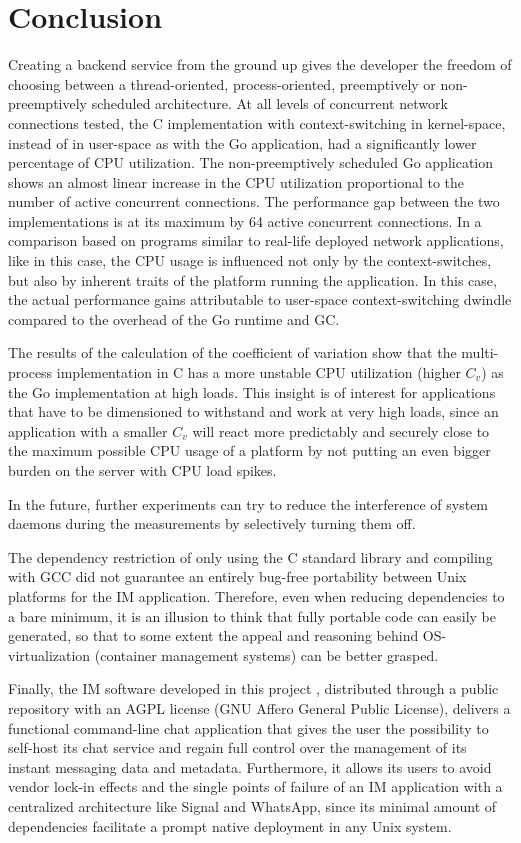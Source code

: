 \section{Conclusion}
Creating a backend service from the ground up gives the developer the freedom of choosing between a thread-oriented, process-oriented, preemptively or non-preemptively scheduled architecture. At all levels of concurrent network connections tested, the C implementation with context-switching in kernel-space, instead of in user-space as with the Go application, had a significantly lower percentage of CPU utilization. The non-preemptively scheduled Go application shows an almost linear increase in the CPU utilization proportional to the number of active concurrent connections. The performance gap between the two implementations is at its maximum by 64 active concurrent connections. In a comparison based on programs similar to real-life deployed network applications, like in this case, the CPU usage is influenced not only by the context-switches, but also by inherent traits of the platform running the application. In this case, the actual performance gains attributable to user-space context-switching dwindle compared to the overhead of the Go runtime and GC.

The results of the calculation of the coefficient of variation show that the multi-process implementation in C has a more unstable CPU utilization (higher $C_v$) as the Go implementation at high loads. This insight is of interest for applications that have to be dimensioned to withstand and work at very high loads, since an application with a smaller $C_v$ will react more predictably and securely close to the maximum possible CPU usage of a platform by not putting an even bigger burden on the server with CPU load spikes.

In the future, further experiments can try to reduce the interference of system daemons during the measurements by selectively turning them off.

The dependency restriction of only using the C standard library and compiling with GCC did not guarantee an entirely bug-free portability between Unix platforms for the IM application. Therefore, even when reducing dependencies to a bare minimum, it is an illusion to think that fully portable code can easily be generated, so that to some extent the appeal and reasoning behind OS-virtualization (container management systems) can be better grasped.

Finally, the IM software developed in this project \cite{Rodriguez2022}, distributed through a public repository with an AGPL license (GNU Affero General Public License), delivers a functional command-line chat application that gives the user the possibility to self-host its chat service and regain full control over the management of its instant messaging data and metadata. Furthermore, it allows its users to avoid vendor lock-in effects and the single points of failure of an IM application with a centralized architecture like Signal and WhatsApp, since its minimal amount of dependencies facilitate a prompt native deployment in any Unix system.